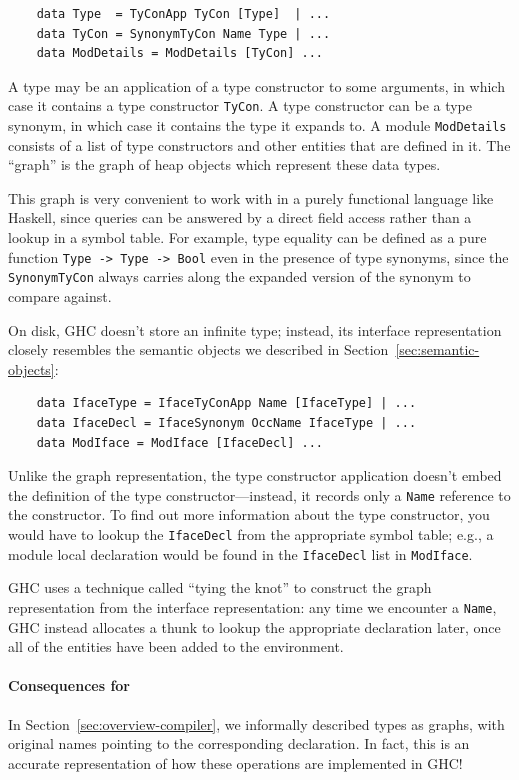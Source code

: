 \begin{lstlisting}
    data Type  = TyConApp TyCon [Type]  | ...
    data TyCon = SynonymTyCon Name Type | ...
    data ModDetails = ModDetails [TyCon] ...
\end{lstlisting}
%
A type may be an application of a type constructor to some arguments, in which
case it contains a type constructor \verb|TyCon|.  A type constructor
can be a type synonym, in which case it contains the type it expands
to.  A module \verb|ModDetails| consists of a list of type constructors
and other entities that are defined in it.  The ``graph'' is the graph of
heap objects which represent these data types.

This graph is very convenient to work with in a purely functional
language like Haskell, since queries can be answered by a direct field
access rather than a lookup in a symbol table.  For example, type
equality can be defined as a pure function \verb|Type -> Type -> Bool|
even in the presence of type synonyms, since the \verb|SynonymTyCon|
always carries along the expanded version of the synonym to compare
against.

On disk, GHC doesn't store an infinite type; instead, its
interface representation closely resembles the semantic objects
we described in Section~\ref{sec:semantic-objects}:

\begin{lstlisting}
    data IfaceType = IfaceTyConApp Name [IfaceType] | ...
    data IfaceDecl = IfaceSynonym OccName IfaceType | ...
    data ModIface = ModIface [IfaceDecl] ...
\end{lstlisting}

\noindent
Unlike the graph representation, the type constructor application
doesn't embed the definition of the type constructor---instead,
it records only a \verb|Name| reference to the constructor. To find out
more information about the type constructor, you would have to lookup
the \verb|IfaceDecl| from the appropriate symbol table; e.g., a module
local declaration would be found in the \verb|IfaceDecl| list in
\verb|ModIface|.

GHC uses a technique called ``tying the knot''
to construct the graph representation from the interface
representation: any time we encounter a \verb|Name|, GHC instead
allocates a thunk to lookup the appropriate declaration later,
once all of the entities have been added to the environment.

\paragraph{Consequences for \Backpack{}}
In Section~\ref{sec:overview-compiler}, we informally described
types as graphs, with original names pointing to the corresponding
declaration.  In fact, this is an accurate representation of how
these operations are implemented in GHC\@!

